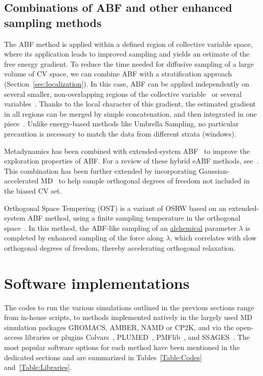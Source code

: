 \documentclass[9pt,review]{livecoms}
\begin{document}
\subsection{Combinations of ABF and other enhanced sampling methods}
\label{sec:abf_hybrids}

The ABF method is applied within a defined region of collective variable space, where its application leads to improved sampling and yields an estimate of the free energy gradient. To reduce the time needed for diffusive sampling of a large volume of CV space, we can combine ABF with a stratification approach (Section~\ref{sec:localization}). In this case, ABF can be applied independently on several smaller, non-overlapping regions of the collective variable~\cite{Chipot2005} or several variables~\cite{Henin2010a}. Thanks to the local character of this gradient, the estimated gradient in all regions can be merged by simple concatenation, and then integrated in one piece~\cite{Henin2021integration}. Unlike energy-based methods like Umbrella Sampling, no particular precaution is necessary to match the data from different strata (windows).

Metadynamics has been combined with extended-system ABF~\cite{Fu_MetaD-eABF_JPCL2018,Fu_MetaD-eABF_JCIM2020} to improve the exploration properties of ABF.
For a review of these hybrid eABF methods, see~\cite{Fu2019}.
This combination has been further extended by incorporating Gaussian-accelerated MD~\cite{Chen_GAMD-MetaD-eABF_JCTC2021} to help sample orthogonal degrees of freedom not included in the biased CV set.

Orthogonal Space Tempering (OST) is a variant of OSRW based on an extended-system ABF method, using a finite sampling temperature in the orthogonal space~\cite{Zheng2012}.
In this method, the ABF-like sampling of an \hyperlink{ref:Alchemical} {alchemical} parameter $\lambda$ is completed by enhanced sampling of the force along $\lambda$, which correlates with slow orthogonal degrees of freedom, thereby accelerating orthogonal relaxation.

\section{Software implementations}
\label{sec:software}
The codes to run the various simulations outlined in the previous sections range from in-house scripts, to methods implemented natively in the largely used MD simulation packages GROMACS, AMBER,  NAMD or CP2K, and via the open-access libraries or plugins Colvars~\cite{Fiorin2013}, PLUMED~\cite{Bonomi-CPC-2009,Tribello2014,plumed-nest}, PMFlib~\cite{kulhanek2011pmflib}, and SSAGES~\cite{Sidky2018}. The most popular software options for each method have been mentioned in the dedicated sections and are summarized in Tables~\ref{Table:Codes} and~\ref{Table:Libraries}.
\end{document}

